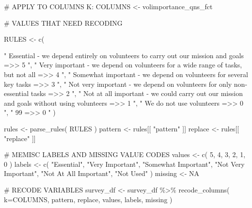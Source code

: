 \documentclass[
  letterpaper,
]{scrbook}
\newenvironment{Shaded}{\begin{snugshade}}{\end{snugshade}}
\newcommand{\AttributeTok}[1]{\textcolor[rgb]{0.40,0.45,0.13}{#1}}
\newcommand{\CommentTok}[1]{\textcolor[rgb]{0.37,0.37,0.37}{#1}}
\newcommand{\ConstantTok}[1]{\textcolor[rgb]{0.56,0.35,0.01}{#1}}
\newcommand{\DecValTok}[1]{\textcolor[rgb]{0.68,0.00,0.00}{#1}}
\newcommand{\FunctionTok}[1]{\textcolor[rgb]{0.28,0.35,0.67}{#1}}
\newcommand{\NormalTok}[1]{\textcolor[rgb]{0.00,0.23,0.31}{#1}}
\newcommand{\OtherTok}[1]{\textcolor[rgb]{0.00,0.23,0.31}{#1}}
\newcommand{\SpecialCharTok}[1]{\textcolor[rgb]{0.37,0.37,0.37}{#1}}
\newcommand{\StringTok}[1]{\textcolor[rgb]{0.13,0.47,0.30}{#1}}
\begin{document}
\begin{Shaded}
\begin{Highlighting}[]
\CommentTok{\# APPLY TO COLUMNS K:}
\NormalTok{COLUMNS }\OtherTok{\textless{}{-}}\NormalTok{  volimportance\_qns\_fct}

\CommentTok{\# VALUES THAT NEED RECODING}

\NormalTok{RULES }\OtherTok{\textless{}{-}} \FunctionTok{c}\NormalTok{(    }

\StringTok{"           Essential {-} we depend entirely on volunteers to carry out our mission and goals    =\textgreater{}\textgreater{}     5   "}\NormalTok{,}
\StringTok{"           Very important {-} we depend on volunteers for a wide range of tasks, but not all    =\textgreater{}\textgreater{}     4   "}\NormalTok{,}
\StringTok{"                        Somewhat important {-} we depend on volunteers for several key tasks    =\textgreater{}\textgreater{}     3   "}\NormalTok{,}
\StringTok{"                 Not very important {-} we depend on volunteers for only non{-}essential tasks    =\textgreater{}\textgreater{}     2   "}\NormalTok{,}
\StringTok{"  Not at all important {-} we could carry out our mission and goals without using volunteers    =\textgreater{}\textgreater{}     1   "}\NormalTok{,}
\StringTok{"                                                                  We do not use volunteers    =\textgreater{}\textgreater{}     0   "}\NormalTok{,}
\StringTok{"                                                                                        99    =\textgreater{}\textgreater{}     0   "}\NormalTok{    )}

\NormalTok{rules }\OtherTok{\textless{}{-}} \FunctionTok{parse\_rules}\NormalTok{( RULES )          }
\NormalTok{pattern }\OtherTok{\textless{}{-}}\NormalTok{ rules[[ }\StringTok{"pattern"}\NormalTok{ ]]}
\NormalTok{replace }\OtherTok{\textless{}{-}}\NormalTok{ rules[[ }\StringTok{"replace"}\NormalTok{ ]]}

\CommentTok{\# MEMISC LABELS AND MISSING VALUE CODES }
\NormalTok{values  }\OtherTok{\textless{}{-}} \FunctionTok{c}\NormalTok{( }\DecValTok{5}\NormalTok{, }\DecValTok{4}\NormalTok{, }\DecValTok{3}\NormalTok{, }\DecValTok{2}\NormalTok{, }\DecValTok{1}\NormalTok{, }\DecValTok{0}\NormalTok{ )}
\NormalTok{labels  }\OtherTok{\textless{}{-}} \FunctionTok{c}\NormalTok{( }\StringTok{"Essential"}\NormalTok{, }\StringTok{"Very Important"}\NormalTok{, }\StringTok{"Somewhat Important"}\NormalTok{, }
              \StringTok{"Not Very Important"}\NormalTok{, }\StringTok{"Not At All Important"}\NormalTok{, }\StringTok{"Not Used"}\NormalTok{ )}
\NormalTok{missing }\OtherTok{\textless{}{-}} \ConstantTok{NA}

\CommentTok{\# RECODE VARIABLES }
\NormalTok{survey\_df }\OtherTok{\textless{}{-}} 
\NormalTok{  survey\_df }\SpecialCharTok{\%\textgreater{}\%} 
  \FunctionTok{recode\_columns}\NormalTok{( }\AttributeTok{k=}\NormalTok{COLUMNS, pattern, replace, values, labels, missing )}
\end{Highlighting}
\end{Shaded}
\end{document}
